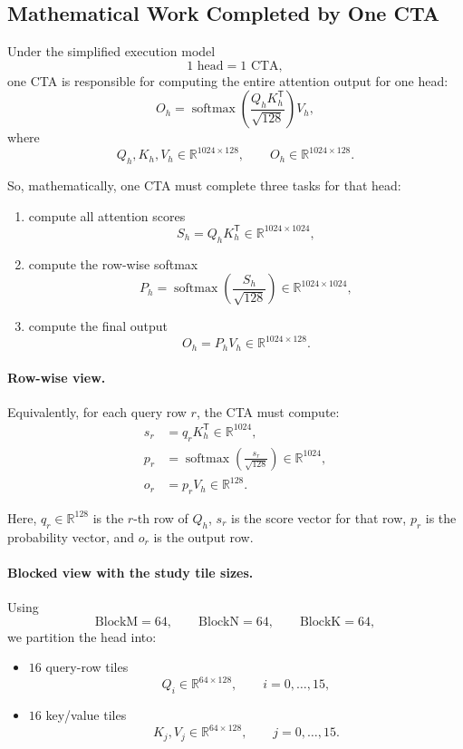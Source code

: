 \documentclass[11pt]{article}
\newcommand{\R}{\mathbb{R}}
\newcommand{\softmax}{\operatorname{softmax}}
\newcommand{\trans}{\mathsf{T}}
\begin{document}
\subsection{Mathematical Work Completed by One CTA}

Under the simplified execution model
\[
\text{1 head} = \text{1 CTA},
\]
one CTA is responsible for computing the entire attention output for one head:
\[
O_h = \softmax\!\left(\frac{Q_h K_h^\trans}{\sqrt{128}}\right)V_h,
\]
where
\[
Q_h, K_h, V_h \in \R^{1024 \times 128},
\qquad
O_h \in \R^{1024 \times 128}.
\]

So, mathematically, one CTA must complete three tasks for that head:
\begin{enumerate}
    \item compute all attention scores
    \[
    S_h = Q_h K_h^\trans \in \R^{1024 \times 1024},
    \]
    \item compute the row-wise softmax
    \[
    P_h = \softmax\!\left(\frac{S_h}{\sqrt{128}}\right)
    \in \R^{1024 \times 1024},
    \]
    \item compute the final output
    \[
    O_h = P_h V_h \in \R^{1024 \times 128}.
    \]
\end{enumerate}

\paragraph{Row-wise view.}
Equivalently, for each query row $r$, the CTA must compute:
\begin{align}
s_r &= q_r K_h^\trans \in \R^{1024}, \\
p_r &= \softmax\!\left(\frac{s_r}{\sqrt{128}}\right) \in \R^{1024}, \\
o_r &= p_r V_h \in \R^{128}.
\end{align}

Here, $q_r \in \R^{128}$ is the $r$-th row of $Q_h$, $s_r$ is the score vector
for that row, $p_r$ is the probability vector, and $o_r$ is the output row.

\paragraph{Blocked view with the study tile sizes.}
Using
\[
\mathrm{BlockM} = 64, \qquad \mathrm{BlockN} = 64, \qquad \mathrm{BlockK} = 64,
\]
we partition the head into:
\begin{itemize}
    \item $16$ query-row tiles
    \[
    Q_i \in \R^{64 \times 128}, \qquad i = 0, \dots, 15,
    \]
    \item $16$ key/value tiles
    \[
    K_j, V_j \in \R^{64 \times 128}, \qquad j = 0, \dots, 15.
    \]
\end{itemize}
\end{document}
